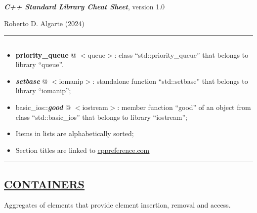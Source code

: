 \documentclass[10pt]{article}
\begin{document}
\noindent
{\large{\textbf{\emph{C++ Standard Library Cheat Sheet}}, {\small version 1.0}}	
}

\noindent
{\small  Roberto D. Algarte (2024)}
\par\noindent\rule{\linewidth}{0.4pt}

\scriptsize
\begin{multicols*}{4}

{\color{Blue}
\subsection*{}	

\begin{itemize}[leftmargin=*,topsep=0.25pt]
  \setlength\itemsep{-1.8pt}
	\item \textbf{priority\_queue} @ $<$queue$>$: class ``std::pri\-ori\-ty\_que\-ue'' that belongs to library ``queue''. 
	\item \emph{\textbf{setbase}} @ $<$iomanip$>$: standalone function ``std::setbase'' that belongs to library ``iomanip'';
	\item basic\_ios::\emph{\textbf{good}} @ $<$iostream$>$: member function ``good'' of an object from class ``std::basic\_ios'' that belongs to library ``iostream''; 
	\item Items in lists are alphabetically sorted; 
	\item Section titles are linked to \href{https://en.cppreference.com}{\underline{cppreference.com}} 
\end{itemize}

\par\noindent\rule{197pt}{0.4pt}

}

{\color{Blue}
\subsection*{\href{https://en.cppreference.com/w/cpp/container}{\underline{CONTAINERS}}}	
\noindent
Aggregates of elements that provide element insertion, removal and access.

}
\end{multicols*}
\end{document}
